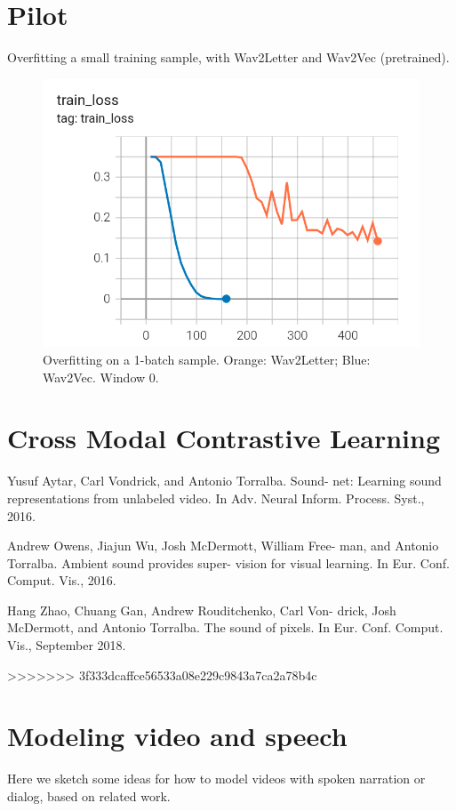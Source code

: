 

\appendix

\section{Pilot}

Overfitting a small training sample, with Wav2Letter and Wav2Vec
(pretrained).

\begin{figure}[htb]
  \includegraphics[scale=0.3]{overfit.png}
\caption{Overfitting on a 1-batch sample. Orange: Wav2Letter; Blue:
  Wav2Vec. Window 0.}
\end{figure}
\section{Cross Modal Contrastive Learning}

Yusuf Aytar, Carl Vondrick, and Antonio Torralba. Sound-
net: Learning sound representations from unlabeled video.
In Adv. Neural Inform. Process. Syst., 2016. 

Andrew Owens, Jiajun Wu, Josh McDermott, William Free-
man, and Antonio Torralba. Ambient sound provides super-
vision for visual learning. In Eur. Conf. Comput. Vis., 2016.

Hang Zhao, Chuang Gan, Andrew Rouditchenko, Carl Von-
drick, Josh McDermott, and Antonio Torralba. The sound of
pixels. In Eur. Conf. Comput. Vis., September 2018.

>>>>>>> 3f333dcaffce56533a08e229c9843a7ca2a78b4c
\section{Modeling video and speech}
Here we sketch some ideas for how to model videos with spoken
narration or dialog, based on related work.

